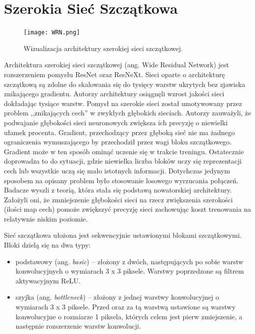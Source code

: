 \documentclass[12pt,a4paper,twoside,titlepage,openright]{book}
\begin{document}
\cite{DBLP:journals/corr/abs-1805-08700}


\section{Szerokia Sieć Szczątkowa}
\begin{figure}[ht]
 	\centering
 			\texttt{[image: WRN.png]}
 		\caption{Wizualizacja architektury szerokiej sieci szczątkowej.}
 \end{figure}

Architektura szerokiej sieci szczątkowej (ang. Wide Residual Network) jest rozszerzeniem pomysłu ResNet oraz ResNeXt. Sieci oparte o architekturę szczątkową są zdolne do skalowania się do tysięcy warstw ukrytych bez zjawiska znikającego gradientu. Autorzy architektury osiągnęli wzrost jakości sieci dokładając tysiące warstw. %
Pomysł na szerokie sieci został umotywowany przez problem ,,znikających cech'' w zwykłych głębokich sieciach. Autorzy zauważyli, że podwajanie głębokości sieci neuronowych zwiększa ich precyzję o niewielki ułamek procenta. Gradient, przechodzący przez głęboką sieć nie ma żadnego ograniczenia wymuszającego by przechodził przez wagi bloku szczątkowego. Gradient może w ten sposób ominąć uczenie się w trakcie treningu. Ostatecznie doprowadza to do sytuacji, gdzie niewielka liczba bloków uczy się reprezentacji cech lub wszystkie uczą się mało istotnych informacji. 
Dotychczas jedynym sposobem na opisany problem było stosowanie losowego wyrzucania połączeń.
Badacze wyszli z teorią, która stała się podstawą nowatorskiej architektury. Założyli oni, że zmniejszenie głębokości sieci na rzecz zwiększenia szerokości (ilości map cech) pomoże zwiększyć precyzję sieci zachowując koszt trenowania na relatywnie niskim poziomie.

Sieć szczątkowa ułożona jest sekwencyjnie ustawionymi blokami szczątkowymi. Bloki dzielą się na dwa typy:
\begin{itemize}
\item podstawowy (ang. \textit{basic}) -- złożony z dwóch, następujących po sobie warstw konwolucyjnych o wymiarach 3 x 3 piksele. Warstwy poprzedzone są filtrem aktywacyjnym ReLU.
\item szyjka (ang. \textit{bottleneck}) -- złożony z jednej warstwy konwolucyjnej o wymiarach 3 x 3 piksele. Przed oraz za tą warstwą ustawione są warstwy konwolucyjne o rozmiarze 1 piksela, których celem jest pierw zmiejszenie, a następnie rozszerzenie warstw konwolucji. 	
\end{itemize}
\end{document}
